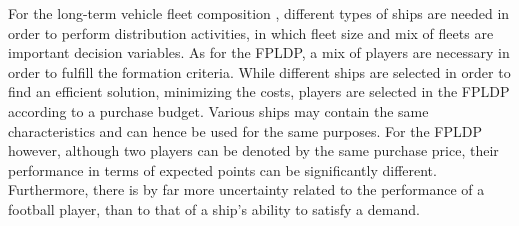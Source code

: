 For the long-term vehicle fleet composition \citep{Jabali}, different types of ships are needed in order to perform distribution activities, in which fleet size and mix of fleets are important decision variables. As for the FPLDP, a mix of players are necessary in order to fulfill the formation criteria. While different ships are selected in order to find an efficient solution, minimizing the costs, players are selected in the FPLDP according to a purchase budget. Various ships may contain the same characteristics and can hence be used for the same purposes. For the FPLDP however, although two players can be denoted by the same purchase price, their performance in terms of expected points can be significantly different. Furthermore, there is by far more uncertainty related to the performance of a football player, than to that of a ship's ability to satisfy a demand. 







\begin{comment}
\cite{Bell} studied team composition variables in order to increase team performance. The results of the meta-analysis performed can be used to effectively compose teams in organizations. \cite{Davis} aim to determine the optimal composition of the pre-hospital medical response team and evaluate the importance of including a doctor to the team. \cite{Jabali} present a continuous approximation model to determine the long-term vehicle fleet composition needed to perform distribution activities, in which fleet size and mix of fleets are important decision variables.  These problems resembles the Fantasy Team problem as similar decisions arise when one are to decide which formation one should use in addition to the mix of players. 
\end{comment}




\newpar

